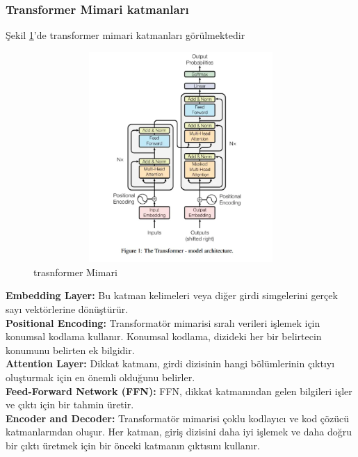 \documentclass[12pt, a4paper]{article}
\begin{document}
	\subsubsection{Transformer Mimari katmanları}
	Şekil \ref{trasnformer}'de transformer mimari katmanları görülmektedir\\
	\begin{figure}
		\centering
		\includegraphics[width=12cm,height=8cm]{aaa.png}
		\caption{trasnformer Mimari}
		\label{trasnformer}
	\end{figure}	
	\textbf{Embedding Layer:} Bu katman kelimeleri veya diğer girdi simgelerini gerçek sayı vektörlerine dönüştürür.\\
	\textbf{Positional Encoding:} Transformatör mimarisi sıralı verileri işlemek için konumsal kodlama kullanır. Konumsal kodlama, dizideki her bir belirtecin konumunu belirten ek bilgidir.\\
	\textbf{Attention Layer:} Dikkat katmanı, girdi dizisinin hangi bölümlerinin çıktıyı oluşturmak için en önemli olduğunu belirler.\\
	\textbf{Feed-Forward Network (FFN):}  FFN, dikkat katmanından gelen bilgileri işler ve çıktı için bir tahmin üretir.\\
	\textbf{ Encoder and Decoder:} Transformatör mimarisi çoklu kodlayıcı ve kod çözücü katmanlarından oluşur. Her katman, giriş dizisini daha iyi işlemek ve daha doğru bir çıktı üretmek için bir önceki katmanın çıktısını kullanır.\cite{mimari}
	
	
\end{document}
